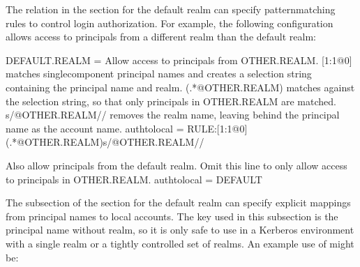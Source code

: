 \documentclass[letterpaper,10pt,english]{sphinxmanual}
\begin{document}
\sphinxAtStartPar
The  relation in the {\hyperref[\detokenize{admin/conf_files/krb5_conf:realms}]{}} section for the
default realm can specify pattern\sphinxhyphen{}matching rules to control login
authorization.  For example, the following configuration allows access
to principals from a different realm than the default realm:

\begin{sphinxVerbatim}[commandchars=\\\{\}]
[realms]
    DEFAULT.REALM = \PYGZob{}
        \PYGZsh{} Allow access to principals from OTHER.REALM.
        \PYGZsh{}
        \PYGZsh{} [1:\PYGZdl{}1@\PYGZdl{}0] matches single\PYGZhy{}component principal names and creates
        \PYGZsh{} a selection string containing the principal name and realm.
        \PYGZsh{}
        \PYGZsh{} (.*@OTHER\PYGZbs{}.REALM) matches against the selection string, so that
        \PYGZsh{} only principals in OTHER.REALM are matched.
        \PYGZsh{}
        \PYGZsh{} s/@OTHER\PYGZbs{}.REALM\PYGZdl{}// removes the realm name, leaving behind the
        \PYGZsh{} principal name as the account name.
        auth\PYGZus{}to\PYGZus{}local = RULE:[1:\PYGZdl{}1@\PYGZdl{}0](.*@OTHER\PYGZbs{}.REALM)s/@OTHER\PYGZbs{}.REALM\PYGZdl{}//

        \PYGZsh{} Also allow principals from the default realm.  Omit this line
        \PYGZsh{} to only allow access to principals in OTHER.REALM.
        auth\PYGZus{}to\PYGZus{}local = DEFAULT
    \PYGZcb{}
\end{sphinxVerbatim}

\sphinxAtStartPar
The  subsection of the {\hyperref[\detokenize{admin/conf_files/krb5_conf:realms}]{}} section
for the default realm can specify explicit mappings from principal
names to local accounts.  The key used in this subsection is the
principal name without realm, so it is only safe to use in a Kerberos
environment with a single realm or a tightly controlled set of realms.
An example use of  might be:

\begin{sphinxVerbatim}[commandchars=\\\{\}]
\PYG{p}{[}\PYG{p}{]}
      
          
              
              
\end{sphinxVerbatim}
\end{document}
